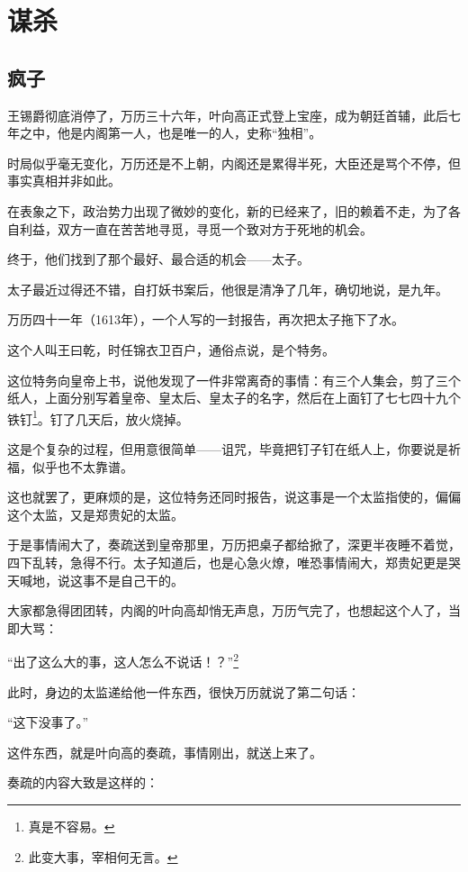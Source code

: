 \section{谋杀}
\ifnum{}
	\begin{multicols}{\theparacolNo}
		\fi
		\subsection{疯子}
		王锡爵彻底消停了，万历三十六年，叶向高正式登上宝座，成为朝廷首辅，此后七年之中，他是内阁第一人，也是唯一的人，史称“独相”。

		时局似乎毫无变化，万历还是不上朝，内阁还是累得半死，大臣还是骂个不停，但事实真相并非如此。

		在表象之下，政治势力出现了微妙的变化，新的已经来了，旧的赖着不走，为了各自利益，双方一直在苦苦地寻觅，寻觅一个致对方于死地的机会。

		终于，他们找到了那个最好、最合适的机会——太子。

		太子最近过得还不错，自打妖书案后，他很是清净了几年，确切地说，是九年。

		万历四十一年（1613年），一个人写的一封报告，再次把太子拖下了水。

		这个人叫王曰乾，时任锦衣卫百户，通俗点说，是个特务。

		这位特务向皇帝上书，说他发现了一件非常离奇的事情：有三个人集会，剪了三个纸人，上面分别写着皇帝、皇太后、皇太子的名字，然后在上面钉了七七四十九个铁钉\footnote{真是不容易。}。钉了几天后，放火烧掉。

		这是个复杂的过程，但用意很简单——诅咒，毕竟把钉子钉在纸人上，你要说是祈福，似乎也不太靠谱。

		这也就罢了，更麻烦的是，这位特务还同时报告，说这事是一个太监指使的，偏偏这个太监，又是郑贵妃的太监。

		于是事情闹大了，奏疏送到皇帝那里，万历把桌子都给掀了，深更半夜睡不着觉，四下乱转，急得不行。太子知道后，也是心急火燎，唯恐事情闹大，郑贵妃更是哭天喊地，说这事不是自己干的。

		大家都急得团团转，内阁的叶向高却悄无声息，万历气完了，也想起这个人了，当即大骂：

		“出了这么大的事，这人怎么不说话！？”\footnote{此变大事，宰相何无言。}

		此时，身边的太监递给他一件东西，很快万历就说了第二句话：

		“这下没事了。”

		这件东西，就是叶向高的奏疏，事情刚出，就送上来了。

		奏疏的内容大致是这样的：


\end{multicols}
